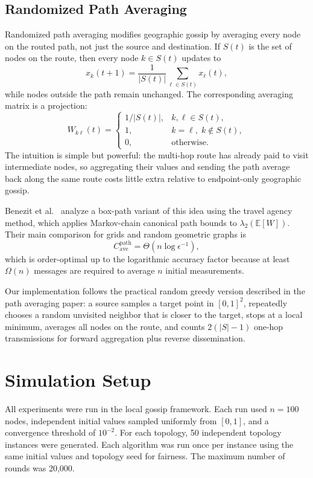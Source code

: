 \documentclass[conference]{IEEEtran}
\begin{document}
\subsection{Randomized Path Averaging}
Randomized path averaging modifies geographic gossip by averaging every node on the routed path, not just the source and destination. If $S(t)$ is the set of nodes on the route, then every node $k\in S(t)$ updates to
\begin{equation}
    x_k(t+1)=\frac{1}{|S(t)|}\sum_{\ell\in S(t)}x_\ell(t),
\end{equation}
while nodes outside the path remain unchanged. The corresponding averaging matrix is a projection:
\begin{equation}
W_{k\ell}(t)=
\begin{cases}
1/|S(t)|, & k,\ell\in S(t),\\
1, & k=\ell,\; k\notin S(t),\\
0, & \text{otherwise.}
\end{cases}
\end{equation}
The intuition is simple but powerful: the multi-hop route has already paid to visit intermediate nodes, so aggregating their values and sending the path average back along the same route costs little extra relative to endpoint-only geographic gossip.

Benezit et al.~\cite{benezit2008order} analyze a box-path variant of this idea using the travel agency method, which applies Markov-chain canonical path bounds to $\lambda_2(\mathbb{E}[W])$. Their main comparison for grids and random geometric graphs is
\begin{equation}
    C_{\mathrm{ave}}^{\mathrm{path}}
    = \Theta(n\log\epsilon^{-1}),
\end{equation}
which is order-optimal up to the logarithmic accuracy factor because at least $\Omega(n)$ messages are required to average $n$ initial measurements.

Our implementation follows the practical random greedy version described in the path averaging paper: a source samples a target point in $[0,1]^2$, repeatedly chooses a random unvisited neighbor that is closer to the target, stops at a local minimum, averages all nodes on the route, and counts $2(|S|-1)$ one-hop transmissions for forward aggregation plus reverse dissemination.

\section{Simulation Setup}
All experiments were run in the local gossip framework. Each run used $n=100$ nodes, independent initial values sampled uniformly from $[0,1]$, and a convergence threshold of $10^{-2}$. For each topology, 50 independent topology instances were generated. Each algorithm was run once per instance using the same initial values and topology seed for fairness. The maximum number of rounds was 20,000.
\end{document}
